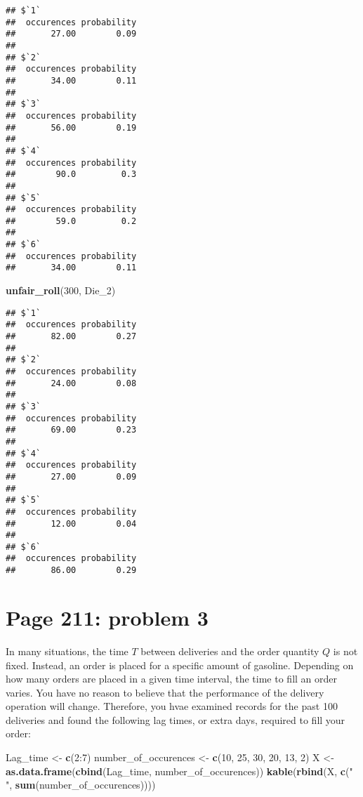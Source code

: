 \documentclass[]{article}
\newenvironment{Shaded}{\begin{snugshade}}{\end{snugshade}}
\newcommand{\KeywordTok}[1]{\textcolor[rgb]{0.13,0.29,0.53}{\textbf{{#1}}}}
\newcommand{\DecValTok}[1]{\textcolor[rgb]{0.00,0.00,0.81}{{#1}}}
\newcommand{\StringTok}[1]{\textcolor[rgb]{0.31,0.60,0.02}{{#1}}}
\newcommand{\NormalTok}[1]{{#1}}
\begin{document}
\begin{verbatim}
## $`1`
##  occurences probability 
##       27.00        0.09 
## 
## $`2`
##  occurences probability 
##       34.00        0.11 
## 
## $`3`
##  occurences probability 
##       56.00        0.19 
## 
## $`4`
##  occurences probability 
##        90.0         0.3 
## 
## $`5`
##  occurences probability 
##        59.0         0.2 
## 
## $`6`
##  occurences probability 
##       34.00        0.11
\end{verbatim}

\begin{Shaded}
\begin{Highlighting}[]
\KeywordTok{unfair_roll}\NormalTok{(}\DecValTok{300}\NormalTok{, Die_2)}
\end{Highlighting}
\end{Shaded}

\begin{verbatim}
## $`1`
##  occurences probability 
##       82.00        0.27 
## 
## $`2`
##  occurences probability 
##       24.00        0.08 
## 
## $`3`
##  occurences probability 
##       69.00        0.23 
## 
## $`4`
##  occurences probability 
##       27.00        0.09 
## 
## $`5`
##  occurences probability 
##       12.00        0.04 
## 
## $`6`
##  occurences probability 
##       86.00        0.29
\end{verbatim}

\section{Page 211: problem 3}\label{page-211-problem-3}

In many situations, the time \(T\) between deliveries and the order
quantity \(Q\) is not fixed. Instead, an order is placed for a specific
amount of gasoline. Depending on how many orders are placed in a given
time interval, the time to fill an order varies. You have no reason to
believe that the performance of the delivery operation will change.
Therefore, you hvae examined records for the past 100 deliveries and
found the following lag times, or extra days, required to fill your
order:

\begin{Shaded}
\begin{Highlighting}[]
\NormalTok{Lag_time <-}\StringTok{ }\KeywordTok{c}\NormalTok{(}\DecValTok{2}\NormalTok{:}\DecValTok{7}\NormalTok{)}
\NormalTok{number_of_occurences <-}\StringTok{ }\KeywordTok{c}\NormalTok{(}\DecValTok{10}\NormalTok{, }\DecValTok{25}\NormalTok{, }\DecValTok{30}\NormalTok{, }\DecValTok{20}\NormalTok{, }\DecValTok{13}\NormalTok{, }\DecValTok{2}\NormalTok{)}
\NormalTok{X <-}\StringTok{ }\KeywordTok{as.data.frame}\NormalTok{(}\KeywordTok{cbind}\NormalTok{(Lag_time, number_of_occurences))}
\KeywordTok{kable}\NormalTok{(}\KeywordTok{rbind}\NormalTok{(X, }\KeywordTok{c}\NormalTok{(}\StringTok{" "}\NormalTok{, }\KeywordTok{sum}\NormalTok{(number_of_occurences))))}
\end{Highlighting}
\end{Shaded}
\end{document}
